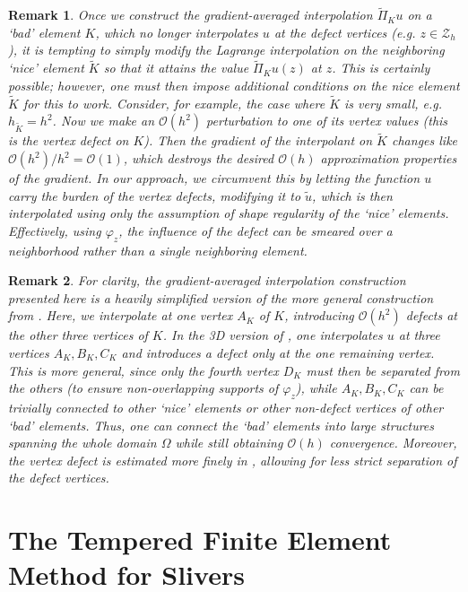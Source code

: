 \documentclass{article}
\newtheorem{remark}{Remark}
\begin{document}
\begin{remark}
Once we construct the gradient-averaged interpolation $\widetilde{\Pi}_K u$ on a `bad' element $K$, which no longer interpolates $u$ at the defect vertices (e.g. $z\in\mathcal{Z}_h$), it is tempting to simply modify the Lagrange interpolation on the neighboring `nice' element $\widetilde{K}$ so that it attains the value $\widetilde{\Pi}_K u(z)$ at $z$. This is certainly possible; however, one must then impose additional conditions on the nice element $\widetilde{K}$ for this to work. Consider, for example, the case where $\widetilde{K}$ is very small, e.g. $h_{\widetilde{K}}=h^2$. Now we make an $\mathcal{O}(h^2)$ perturbation to one of its vertex values (this is the vertex defect on $K$). Then the gradient of the interpolant on $\widetilde{K}$ changes like $\mathcal{O}(h^2)/h^2=\mathcal{O}(1)$, which destroys the desired $\mathcal{O}(h)$ approximation properties of the gradient. In our approach, we circumvent this by letting the function $u$ carry the burden of the vertex defects, modifying it to $\widetilde{u}$, which is then interpolated using only the assumption of shape regularity of the `nice' elements. Effectively, using $\varphi_z$, the influence of the defect can be smeared over a neighborhood rather than a single neighboring element.
\end{remark}


\begin{remark}
For clarity, the gradient-averaged interpolation construction presented here is a heavily simplified version of the more general construction from \cite{kuvcera2016necessary}. Here, we interpolate at one vertex $A_K$ of $K$, introducing $\mathcal{O}(h^2)$ defects at the other three vertices of $K$. In the 3D version of \cite{kuvcera2016necessary}, one interpolates $u$ at three vertices $A_K,B_K,C_K$ and introduces a defect only at the one remaining vertex. This is more general, since only the fourth vertex $D_K$ must then be separated from the others (to ensure non-overlapping supports of $\varphi_z$), while $A_K,B_K,C_K$ can be trivially connected to other `nice' elements or other non-defect vertices of other `bad' elements. Thus, one can connect the `bad' elements into large structures spanning the whole domain $\Omega$ while still obtaining $\mathcal{O}(h)$ convergence. Moreover, the vertex defect is estimated more finely in \cite{kuvcera2016necessary}, allowing for less strict separation of the defect vertices.
\end{remark}

\section{The Tempered Finite Element Method for Slivers}
\label{sec:tfem}
\end{document}
